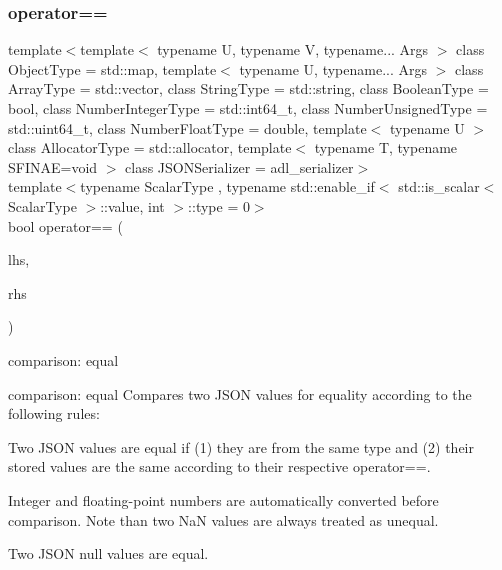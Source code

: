 \subsubsection{\texorpdfstring{operator==}{operator==}\hspace{0.1cm}{\footnotesize\ttfamily [3/3]}}
{\footnotesize\ttfamily template$<$template$<$ typename U, typename V, typename... Args $>$ class Object\+Type = std\+::map, template$<$ typename U, typename... Args $>$ class Array\+Type = std\+::vector, class String\+Type  = std\+::string, class Boolean\+Type  = bool, class Number\+Integer\+Type  = std\+::int64\+\_\+t, class Number\+Unsigned\+Type  = std\+::uint64\+\_\+t, class Number\+Float\+Type  = double, template$<$ typename U $>$ class Allocator\+Type = std\+::allocator, template$<$ typename T, typename S\+F\+I\+N\+A\+E=void $>$ class J\+S\+O\+N\+Serializer = adl\+\_\+serializer$>$ \\
template$<$typename Scalar\+Type , typename std\+::enable\+\_\+if$<$ std\+::is\+\_\+scalar$<$ Scalar\+Type $>$\+::value, int $>$\+::type  = 0$>$ \\
bool operator== (\begin{DoxyParamCaption}\item[{const Scalar\+Type}]{lhs,  }\item[{\mbox{\hyperlink{classnlohmann_1_1basic__json_a4057c5425f4faacfe39a8046871786ca}{const\+\_\+reference}}}]{rhs }\end{DoxyParamCaption})\hspace{0.3cm}{\ttfamily [friend]}}



comparison\+: equal 

comparison\+: equal Compares two J\+S\+ON values for equality according to the following rules\+:
\begin{DoxyItemize}
\item Two J\+S\+ON values are equal if (1) they are from the same type and (2) their stored values are the same according to their respective {\ttfamily operator==}.
\item Integer and floating-\/point numbers are automatically converted before comparison. Note than two NaN values are always treated as unequal.
\item Two J\+S\+ON null values are equal.
\end{DoxyItemize}

